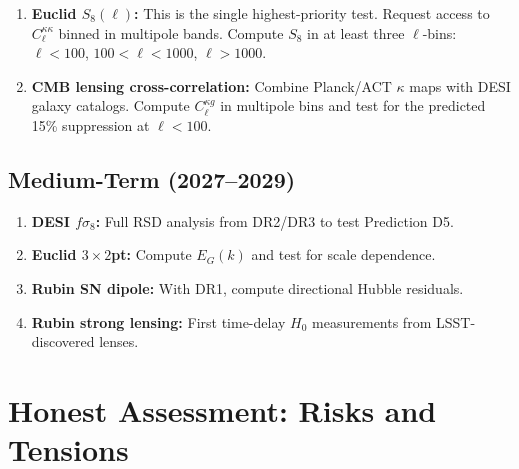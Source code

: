 \documentclass[12pt]{article}
\begin{document}
\begin{enumerate}
\item \textbf{Euclid $S_8(\ell)$:} This is the single highest-priority test. Request access to $C_\ell^{\kappa\kappa}$ binned in multipole bands. Compute $S_8$ in at least three $\ell$-bins: $\ell < 100$, $100 < \ell < 1000$, $\ell > 1000$.
\item \textbf{CMB lensing cross-correlation:} Combine Planck/ACT $\kappa$ maps with DESI galaxy catalogs. Compute $C_\ell^{\kappa g}$ in multipole bins and test for the predicted 15\% suppression at $\ell < 100$.
\end{enumerate}

\subsection{Medium-Term (2027--2029)}

\begin{enumerate}
\item \textbf{DESI $f\sigma_8$:} Full RSD analysis from DR2/DR3 to test Prediction D5.
\item \textbf{Euclid $3\times2$pt:} Compute $E_G(k)$ and test for scale dependence.
\item \textbf{Rubin SN dipole:} With DR1, compute directional Hubble residuals.
\item \textbf{Rubin strong lensing:} First time-delay $H_0$ measurements from LSST-discovered lenses.
\end{enumerate}

\section{Honest Assessment: Risks and Tensions}
\label{sec:risks}
\end{document}
